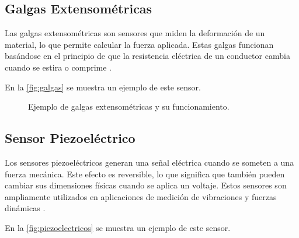 \subsection{Galgas Extensométricas}
Las galgas extensométricas son sensores que miden la deformación de un material, lo que permite calcular la fuerza aplicada. Estas galgas funcionan basándose en el principio de que la resistencia eléctrica de un conductor cambia cuando se estira o comprime \cite{Galgas}.

En la \autoref{fig:galgas} se muestra un ejemplo de este sensor.

\begin{figure}[h!]
	\centering
	\caption{Ejemplo de galgas extensométricas y su funcionamiento.}
	\label{fig:galgas}
\end{figure}

\subsection{Sensor Piezoeléctrico}
Los sensores piezoeléctricos generan una señal eléctrica cuando se someten a una fuerza mecánica. Este efecto es reversible, lo que significa que también pueden cambiar sus dimensiones físicas cuando se aplica un voltaje. Estos sensores son ampliamente utilizados en aplicaciones de medición de vibraciones y fuerzas dinámicas \cite{Piezoelectricos}.

En la \autoref{fig:piezoelectricos} se muestra un ejemplo de este sensor.

